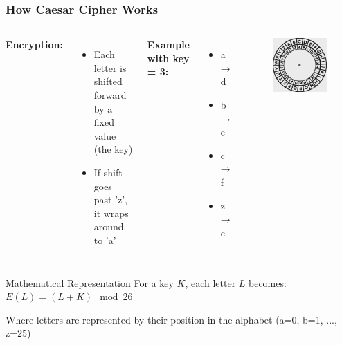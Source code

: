 \documentclass{beamer}
\begin{document}
\begin{frame}
    \frametitle{How Caesar Cipher Works}
    \begin{columns}
    \textbf{Encryption:}
    \begin{itemize}
        \item Each letter is shifted forward by a fixed value (the key)
        \item If shift goes past 'z', it wraps around to 'a'
    \end{itemize}
    
    \textbf{Example with key = 3:}
    \begin{itemize}
        \item a → d
        \item b → e
        \item c → f
        \item z → c
    \end{itemize}
    
    \begin{figure}
        \centering
        \includegraphics[width=0.75\linewidth]{cs12-cryptography-caesar-cipher-disk.jpg}
    \end{figure}
    \end{columns}
    
    \begin{block}{Mathematical Representation}
        For a key $K$, each letter $L$ becomes:
        $E(L) = (L + K) \mod 26$
        
        Where letters are represented by their position in the alphabet (a=0, b=1, ..., z=25)
    \end{block}
\end{frame}
\end{document}
